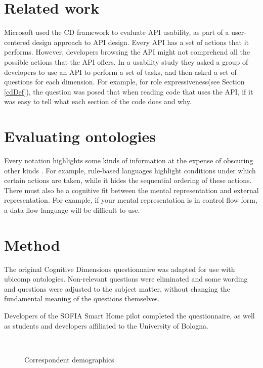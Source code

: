 \section{Related work}
	Microsoft \cite{Clarke2004} used the CD framework to evaluate API usability, as part of a user-centered design approach to API design. Every API has a set of actions that it performs. However, developers browsing the API might not comprehend all the possible actions that the API offers. In a usability study they asked a group of developers to use an API to perform a set of tasks, and then asked a set of questions for each dimension. For example, for role expressiveness(see Section \ref{cdDef}), the question was posed that when reading code that uses the API, if it was easy to tell what each section of the code does and why.

\section{Evaluating ontologies}
    
Every notation highlights some kinds of information at the expense of obscuring other kinds \cite{Green1996}. For example, rule-based languages highlight conditions under which certain actions are taken, while it hides the sequential ordering of these actions. There must also be a cognitive fit between the mental representation and external representation. For example, if your mental representation is in control flow form, a data flow language will be difficult to use. 




\section{Method}

The original Cognitive Dimensions questionnaire \cite{Blackwell2007} was adapted for use with ubicomp ontologies. Non-relevant questions were eliminated and some wording and questions were adjusted to the subject matter, without changing the fundamental meaning of the questions themselves. 

Developers of the SOFIA Smart Home pilot completed the questionnaire, as well as students and developers affiliated to the University of Bologna.

\begin{figure}[bth]
         \quad
         \\
         \quad
        
        \caption{Correspondent demographics}\label{demographics}
\end{figure}

